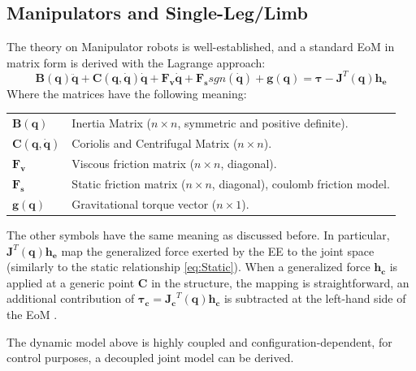 \subsection{Manipulators and Single-Leg/Limb}
\label{sec:manipulatorDyn}
The theory on Manipulator robots is well-established, and a standard EoM in matrix form is derived with the Lagrange approach: 
\begin{equation}
    \label{eq:ManipulatorEoM}
    \mathbf{B}(\mathbf{q})\mathbf{\ddot{q}} + \mathbf{C}(\mathbf{q},\mathbf{\dot{q}})\mathbf{\dot{q}} + \mathbf{F_v\dot{q}} + \mathbf{F_{s}}sgn(\mathbf{\dot{q}})+ \mathbf{g}(\mathbf{q}) = \mathbf{\tau} - \mathbf{J}^T(\mathbf{q})\mathbf{h_e}
\end{equation}
Where the matrices have the following meaning: 
\begin{table}[H]
    \begin{tabular}{ll}
        ${\mathbf{B}(\mathbf{q})}$ & Inertia Matrix ($n \times n$, symmetric and positive definite).\\[2pt]
        ${\mathbf{C}(\mathbf{q}, \mathbf{\dot{q}})}$ & Coriolis and Centrifugal Matrix ($n \times n$).\\[2pt]
        $\mathbf{F_v}$ & Viscous friction matrix ($n \times n$, diagonal).\\[2pt]
        $\mathbf{F_s}$ & Static friction matrix ($n \times n$, diagonal), coulomb friction model.\\[2pt]
        $\mathbf{g}(\mathbf{q})$ & Gravitational torque vector ($n \times 1$).\\[2pt]
   \end{tabular}
\end{table}
The other symbols have the same meaning as discussed before. 
In particular, $\mathbf{J}^T(\mathbf{q})\mathbf{h_e}$ map the generalized force exerted by the EE to the joint space (similarly to the static relationship \ref{eq:Static}). When a generalized force $\mathbf{h_c}$ is applied at a generic point $\mathbf{C}$ in the structure, the mapping is straightforward, an additional contribution of $\mathbf{\tau_c} = \mathbf{J_c}^T(\mathbf{q})\mathbf{h_c}$ is subtracted at the left-hand side of the EoM \cite{DeLucaContact1}. 

The dynamic model above is highly coupled and configuration-dependent, for control purposes, a decoupled joint model can be derived. 

